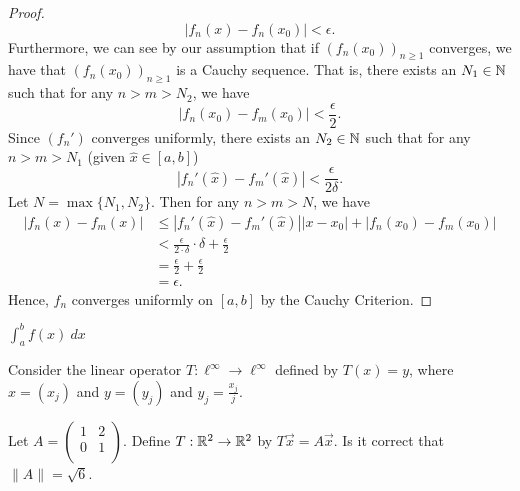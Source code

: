 \documentclass[a4paper]{article}
\begin{document}
\begin{proof}
    \[  | {f}_{n}(x) - {f}_{n}({x}_{0}) |  < \epsilon. \]
    Furthermore, we can see by our assumption that if \( ({f}_{n}({x}_{0}))_{n \geq 1 } \) converges, we have that \( ({f}_{n}({x}_{0}))_{n \geq 1 } \) is a Cauchy sequence. That is, there exists an \( {N}_{1} \in \mathbb{N} \) such that for any \(  n > m > {N}_{2} \), we have 
    \[  | {f}_{n}({x}_{0}) - {f}_{m}({x}_{0}) |  < \frac{ \epsilon }{ 2 }. \]
    Since \( ({f}_{n}') \) converges uniformly, there exists an \( {N}_{2} \in \mathbb{N} \) such that for any \( n > m > {N}_{1} \) (given \( \hat{x} \in [a,b] \)) 
    \[  | {f}_{n}'(\hat{x}) - {f}_{m}'(\hat{x})  |  < \frac{ \epsilon }{ 2 \delta }.  \]
    Let \( N = \max \{ {N}_{1}, {N}_{2} \}  \). Then for any \( n > m > N \), we have 
    \begin{align*}
        | {f}_{n}(x) - {f}_{m}(x) | &\leq | {f}_{n}'(\hat{x}) - {f}_{m}'(\hat{x})  | | x - {x}_{0} |  + | {f}_{n}({x}_{0}) - {f}_{m}({x}_{0}) |  \\
                                    &< \frac{ \epsilon }{ 2 \cdot \delta }  \cdot \delta + \frac{ \epsilon  }{  2  }  \\
                                    &= \frac{ \epsilon }{ 2 }  + \frac{ \epsilon }{ 2 }  \\
                                    &= \epsilon.
    \end{align*}
    Hence, \( {f}_{n}  \) converges uniformly on \( [a,b] \) by the Cauchy Criterion.
\end{proof}

\( \int_{ a }^{ b } f(x) \ dx  \)


Consider the linear operator \( T: \ell^{\infty } \to \ell^{\infty }  \) defined by \( T(x) = y  \), where \( x = ({x}_{j}) \) and \( y = ({y}_{j}) \) and \( {y}_{j} = \frac{ {x}_{j}  }{  j  }  \).

Let \( A = \begin{pmatrix} 1 & 2 \\ 0 & 1 \\ \end{pmatrix}  \). Define \( T: \mathbb{R}^{2} \to \mathbb{R}^{2} \) by \( T \vec{x} = A \vec{x} \). Is it correct that \( \|A \| = \sqrt{  6  }  \).
\end{document}
